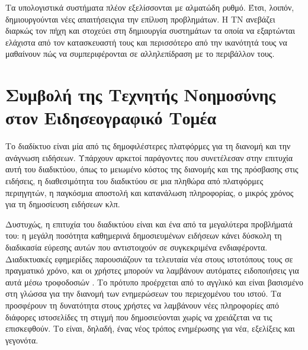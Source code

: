 Τα υπολογιστικά συστήματα πλέον εξελίσσονται με αλματώδη ρυθμό. 
Έτσι, λοιπόν, δημιουργούνται νέες απαιτήσειςγια την επίλυση προβλημάτων.
Η ΤΝ ανεβάζει διαρκώς τον πήχη και στοχεύει στη δημιουργία συστημάτων
τα οποία να εξαρτώνται ελάχιστα από τον κατασκευαστή τους 
και περισσότερο από την ικανότητά τους να μαθαίνουν πώς να συμπεριφέρονται 
σε αλληλεπίδραση με το περιβάλλον τους.

\section{Συμβολή της Τεχνητής Νοημοσύνης στον Ειδησεογραφικό Τομέα}

Το διαδίκτυο είναι μία από τις δημοφιλέστερες πλατφόρμες για τη διανομή και την ανάγνωση
ειδήσεων. Υπάρχουν αρκετοί παράγοντες που συνετέλεσαν στην επιτυχία αυτή του
διαδικτύου, όπως το μειωμένο κόστος της διανομής και της πρόσβασης στις ειδήσεις, 
η διαθεσιμότητα του διαδικτύου σε μια πληθώρα από πλατφόρμες περιηγητών, 
η παγκόσμια αποστολή και κατανάλωση πληροφορίας, ο μικρός χρόνος για τη δημοσίευση ειδήσεων κλπ. 

Δυστυχώς, η επιτυχία του διαδικτύου είναι και ένα από τα μεγαλύτερα προβλήματά του: 
η μεγάλη ποσότητα καθημερινά δημοσιευμένων ειδήσεων κάνει δύσκολη τη διαδικασία εύρεσης αυτών που
αντιστοιχούν σε συγκεκριμένα ενδιαφέροντα. Διαδικτυακές εφημερίδες παρουσιάζουν
τα τελευταία νέα στους ιστοτόπους τους σε πραγματικό χρόνο, και οι χρήστες μπορούν
να λαμβάνουν αυτόματες ειδοποιήσεις για αυτά μέσω τροφοδοσιών {}. Το πρότυπο
{} προέρχεται από το αγγλικό {} και είναι βασισμένο στη
γλώσσα {} για την διανομή των ενημερώσεων του περιεχομένου του ιστού. Τα {} προσφέρουν τη δυνατότητα στους χρήστες να λαμβάνουν νέες πληροφορίες από
διάφορες ιστοσελίδες τη στιγμή που δημοσιεύονται χωρίς να χρειάζεται να τις
επισκεφθούν. Το {} είναι, δηλαδή, ένας νέος τρόπος ενημέρωσης για νέα, εξελίξεις και
γεγονότα. 

